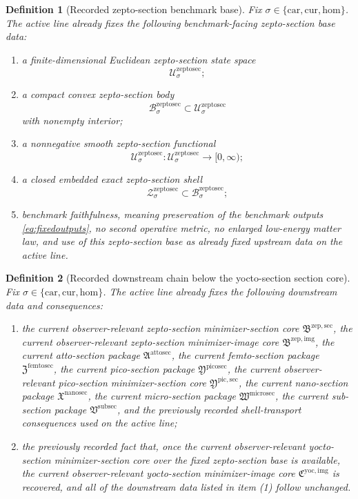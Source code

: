 \documentclass[11pt]{article}
\newcommand{\Car}{\mathrm{car}}
\newcommand{\Cur}{\mathrm{cur}}
\newcommand{\Hom}{\mathrm{hom}}
\newcommand{\SubSectionPackage}{\mathfrak V^{\mathrm{subsec}}}
\newcommand{\MicroSectionPackage}{\mathfrak W^{\mathrm{microsec}}}
\newcommand{\NanoSectionPackage}{\mathfrak X^{\mathrm{nanosec}}}
\newcommand{\PicoSectionPackage}{\mathfrak Y^{\mathrm{picosec}}}
\newcommand{\PicoMinSectionCore}{\mathfrak Y^{\mathrm{pic,sec}}}
\newcommand{\FemtoSectionPackage}{\mathfrak Z^{\mathrm{femtosec}}}
\newcommand{\AttoSectionPackage}{\mathfrak A^{\mathrm{attosec}}}
\newcommand{\ZeptoImageCore}{\mathfrak B^{\mathrm{zep,img}}}
\newcommand{\ZeptoMinSectionCore}{\mathfrak B^{\mathrm{zep,sec}}}
\newcommand{\ZeptoSectionSpace}[1]{\mathcal U_{#1}^{\mathrm{zeptosec}}}
\newcommand{\ZeptoSectionBody}[1]{\mathcal B_{#1}^{\mathrm{zeptosec}}}
\newcommand{\ZeptoSectionFunctional}[1]{\mathscr U_{#1}^{\mathrm{zeptosec}}}
\newcommand{\ZeptoSectionShell}[1]{\mathcal Z_{#1}^{\mathrm{zeptosec}}}
\newcommand{\YoctoImageCore}{\mathfrak C^{\mathrm{yoc,img}}}
\newtheorem{definition}{Definition}
\begin{document}
\begin{definition}[Recorded zepto-section benchmark base]
\label{def:zeptobase}
Fix \(\sigma\in\{\Car,\Cur,\Hom\}\). The active line already fixes the following benchmark-facing zepto-section base data:
\begin{enumerate}
    \item a finite-dimensional Euclidean zepto-section state space
    \[
    \ZeptoSectionSpace{\sigma};
    \]
    \item a compact convex zepto-section body
    \[
    \ZeptoSectionBody{\sigma}\subset\ZeptoSectionSpace{\sigma}
    \]
    with nonempty interior;
    \item a nonnegative smooth zepto-section functional
    \[
    \ZeptoSectionFunctional{\sigma}:\ZeptoSectionSpace{\sigma}\to[0,\infty);
    \]
    \item a closed embedded exact zepto-section shell
    \[
    \ZeptoSectionShell{\sigma}\subset\ZeptoSectionBody{\sigma};
    \]
    \item benchmark faithfulness, meaning preservation of the benchmark outputs \eqref{eq:fixedoutputs}, no second operative metric, no enlarged low-energy matter law, and use of this zepto-section base as already fixed upstream data on the active line.
\end{enumerate}
\end{definition}

\begin{definition}[Recorded downstream chain below the yocto-section section core]
\label{def:downstream}
Fix \(\sigma\in\{\Car,\Cur,\Hom\}\). The active line already fixes the following downstream data and consequences:
\begin{enumerate}
    \item the current observer-relevant zepto-section minimizer-section core \(\ZeptoMinSectionCore\), the current observer-relevant zepto-section minimizer-image core \(\ZeptoImageCore\), the current atto-section package \(\AttoSectionPackage\), the current femto-section package \(\FemtoSectionPackage\), the current pico-section package \(\PicoSectionPackage\), the current observer-relevant pico-section minimizer-section core \(\PicoMinSectionCore\), the current nano-section package \(\NanoSectionPackage\), the current micro-section package \(\MicroSectionPackage\), the current sub-section package \(\SubSectionPackage\), and the previously recorded shell-transport consequences used on the active line;
    \item the previously recorded fact that, once the current observer-relevant yocto-section minimizer-section core over the fixed zepto-section base is available, the current observer-relevant yocto-section minimizer-image core \(\YoctoImageCore\) is recovered, and all of the downstream data listed in item (1) follow unchanged.
\end{enumerate}
\end{definition}
\end{document}
